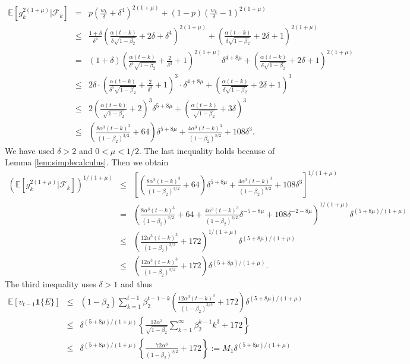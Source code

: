 \documentclass[twoside]{article}
\def\EE{\mathbb{E}}
\def\FF{\mathcal{F}}
\begin{document}
\begin{eqnarray}
\EE\left[ g_k^{2(1+\mu)}|\FF_k \right] &=& p \left( \frac{w_k}{\delta} + \delta ^4 \right)^{2(1+\mu)} + (1-p) \left( \frac{w_k}{\delta} -1\right)^{2(1+\mu)}\nonumber \\
&\leq& \frac{1+\delta}{\delta ^4 }\left( \frac{\alpha(t-k)}{\delta \sqrt{1-\beta_2}} + 2\delta + \delta ^ 4\right)^{2(1+\mu)} + \left( \frac{\alpha(t-k)}{\delta \sqrt{1-\beta_2}} + 2\delta + 1\right)^{2(1+\mu)} \nonumber\\
&=& (1+\delta) \left(\frac{\alpha(t-k)}{\delta^5 \sqrt{1-\beta_2}} +\frac{2}{\delta ^ 3}+1\right)^{2(1+\mu)} \delta^{4+8\mu}+\left( \frac{\alpha(t-k)}{\delta \sqrt{1-\beta_2}} + 2\delta + 1\right)^{2(1+\mu)}\nonumber\\
&\leq& 2\delta \cdot \left(\frac{\alpha(t-k)}{\delta^5 \sqrt{1-\beta_2}} +\frac{2}{\delta ^ 3}+1\right)^{3}\cdot \delta ^{4 + 8\mu}+\left( \frac{\alpha(t-k)}{\delta \sqrt{1-\beta_2}} + 2\delta + 1\right)^3\nonumber \\
&\leq& 2\left(\frac{\alpha(t-k)}{\sqrt{1-\beta_2}} + 2\right)^3 \delta ^{5+8\mu} + \left( \frac{\alpha(t-k)}{\sqrt{1-\beta_2}} +3\delta\right)^3  \nonumber \\
&\leq& \left(\frac{8\alpha^3 (t-k)^3}{(1-\beta_2)^{3/2}} + 64\right) \delta ^{5+8\mu} + \frac{4\alpha^3 (t-k)^3}{(1-\beta_2)^{3/2}} + 108 \delta^3.\nonumber
\end{eqnarray}
We have used $\delta>2$ and $0<\mu<1/2$. The last inequality holds because of Lemma \ref{lem:simplecalculus}. Then we obtain
\begin{eqnarray}
\left(\EE\left[ g_k^{2(1+\mu)}|\FF_k \right]\right)^{1/(1+\mu)} &\leq& \left[\left(\frac{8\alpha^3 (t-k)^3}{(1-\beta_2)^{3/2}} + 64\right) \delta ^{5+8\mu} + \frac{4\alpha^3 (t-k)^3}{(1-\beta_2)^{3/2}} + 108 \delta^3\right]^{1/(1+\mu)}\nonumber \\
&=& \left(\frac{8\alpha^3 (t-k)^3}{(1-\beta_2)^{3/2}} + 64  + \frac{4\alpha^3 (t-k)^3}{(1-\beta_2)^{3/2}}\delta ^{-5-8\mu} + 108 \delta^{-2-8\mu}\right)^{1/(1+\mu)} \delta ^{(5 + 8\mu)/(1+\mu)}\nonumber \\
&\leq& \left( \frac{12 \alpha ^3(t-k)^3}{(1-\beta_2)^{3/2}} + 172\right)^{1/(1+\mu)} \delta ^{(5+8\mu)/(1+\mu)} \nonumber\\
&\leq& \left( \frac{12 \alpha ^3(t-k)^3}{(1-\beta_2)^{3/2}} + 172\right) \delta ^{(5+8\mu)/(1+\mu)}.\nonumber
\end{eqnarray}
The third inequality uses $\delta>1$ and thus
\begin{eqnarray}
\EE[v_{t-1}\mathbf{1}\{E\}] &\leq&  (1-\beta_2)\sum_{k=1}^{t-1}\beta_2^{t-1-k}\left( \frac{12 \alpha ^3(t-k)^3}{(1-\beta_2)^{3/2}} + 172\right) \delta ^{(5+8\mu)/(1+\mu)} \nonumber \\
&\leq& \delta^{(5+8\mu)/(1+\mu)} \left\{ \frac{12\alpha^3}{\sqrt{1-\beta_2}}\sum_{k=1}^\infty \beta_2^{k-1}k^3 + 172 \right\}\nonumber\\
&\leq& \delta^{(5+8\mu)/(1+\mu)} \left\{ \frac{72\alpha^3}{(1-\beta_2)^{9/2}} + 172 \right\}:= M_1 \delta^{(5+8\mu)/(1+\mu)}\nonumber
\end{eqnarray}
\end{document}
